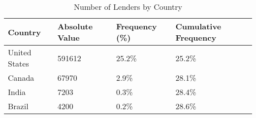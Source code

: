 \begin{table}[!htb]
\centering
\begin{tabular}{llll}
  \hline
Country & Absolute Value & Frequency (\%) & Cumulative Frequency \\ 
  \hline
  United States & 591612 & 25.2\% & 25.2\% \\ 
  Canada & 67970 & 2.9\% & 28.1\% \\ 
  India & 7203 & 0.3\% & 28.4\% \\ 
  Brazil & 4200 & 0.2\% & 28.6\% \\ 
   \hline
\end{tabular}
\caption{Number of Lenders by Country} 
\label{tab:Lenders_Country}
\end{table}

